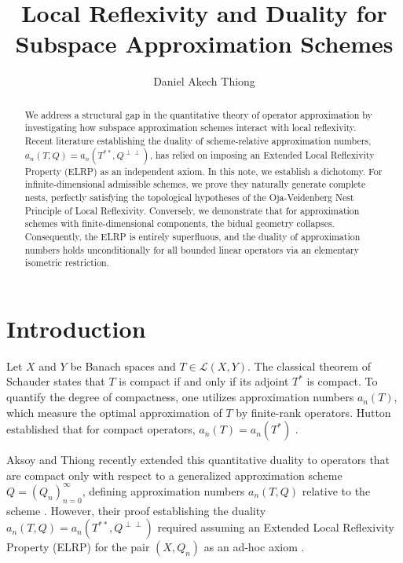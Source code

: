 \documentclass[11pt,reqno]{amsart}
\theoremstyle{definition}
\begin{document}
\title[Local Reflexivity and Duality]{Local Reflexivity and Duality for Subspace Approximation Schemes}

\author{Daniel Akech Thiong}
\address{Department of Mathematics, Claremont Graduate University, 710 N. College Avenue, Claremont, CA 91711, USA}


\begin{abstract}
We address a structural gap in the quantitative theory of operator approximation by investigating how subspace approximation schemes interact with local reflexivity. Recent literature establishing the duality of scheme-relative approximation numbers, $a_n(T,Q) = a_n(T^{**}, Q^{\perp\perp})$, has relied on imposing an Extended Local Reflexivity Property (ELRP) as an independent axiom. In this note, we establish a dichotomy. For infinite-dimensional admissible schemes, we prove they naturally generate complete nests, perfectly satisfying the topological hypotheses of the Oja-Veidenberg Nest Principle of Local Reflexivity. Conversely, we demonstrate that for approximation schemes with finite-dimensional components, the bidual geometry collapses. Consequently, the ELRP is entirely superfluous, and the duality of approximation numbers holds unconditionally for all bounded linear operators via an elementary isometric restriction. 
\end{abstract}

\maketitle

\section{Introduction}
Let $X$ and $Y$ be Banach spaces and $T \in \mathcal{L}(X, Y)$. The classical theorem of Schauder states that $T$ is compact if and only if its adjoint $T^*$ is compact. To quantify the degree of compactness, one utilizes approximation numbers $a_n(T)$, which measure the optimal approximation of $T$ by finite-rank operators. Hutton established that for compact operators, $a_n(T) = a_n(T^*)$ \cite{Hutton1974}. 

Aksoy and Thiong recently extended this quantitative duality to operators that are compact only with respect to a generalized approximation scheme $Q = (Q_n)_{n=0}^\infty$, defining approximation numbers $a_n(T, Q)$ relative to the scheme \cite{AT2023}. However, their proof establishing the duality $a_n(T,Q) = a_n(T^{**}, Q^{\perp\perp})$ required assuming an Extended Local Reflexivity Property (ELRP) for the pair $(X, Q_n)$ as an ad-hoc axiom \cite{AT2023}. 
\end{document}
